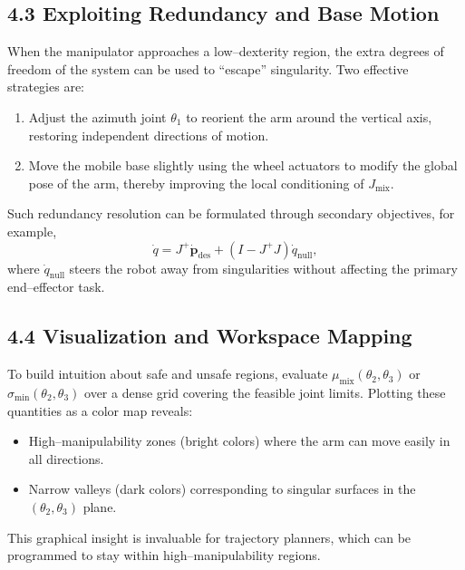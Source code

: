 \documentclass[12pt,a4paper]{article}
\begin{document}
\subsection*{4.3 Exploiting Redundancy and Base Motion}
When the manipulator approaches a low--dexterity region,
the extra degrees of freedom of the system
can be used to ``escape'' singularity.
Two effective strategies are:
\begin{enumerate}
  \item Adjust the azimuth joint $\theta_1$
        to reorient the arm around the vertical axis,
        restoring independent directions of motion.
  \item Move the mobile base slightly using the wheel actuators
        to modify the global pose of the arm,
        thereby improving the local conditioning of $J_{\text{mix}}$.
\end{enumerate}
Such redundancy resolution can be formulated through secondary objectives,
for example,
\[
\dot{q} = J^{+}\dot{\bm{p}}_{\mathrm{des}}
          + (I - J^{+}J)\dot{q}_{\mathrm{null}},
\]
where $\dot{q}_{\mathrm{null}}$ steers the robot away from singularities
without affecting the primary end--effector task.

\subsection*{4.4 Visualization and Workspace Mapping}
To build intuition about safe and unsafe regions,
evaluate $\mu_{\text{mix}}(\theta_2,\theta_3)$ or $\sigma_{\min}(\theta_2,\theta_3)$
over a dense grid covering the feasible joint limits.
Plotting these quantities as a color map reveals:
\begin{itemize}
  \item High--manipulability zones (bright colors)
        where the arm can move easily in all directions.
  \item Narrow valleys (dark colors)
        corresponding to singular surfaces in the $(\theta_2,\theta_3)$ plane.
\end{itemize}
This graphical insight is invaluable for trajectory planners,
which can be programmed to stay within high--manipulability regions.
\end{document}
